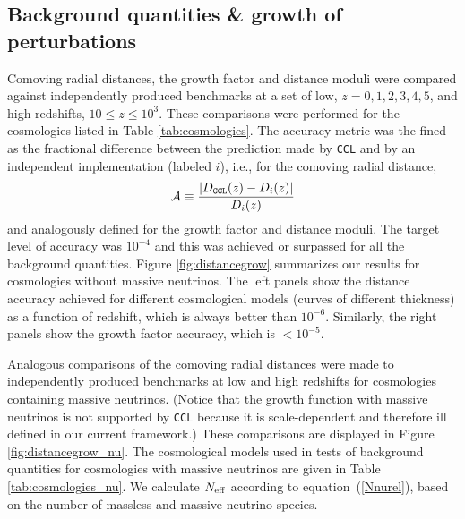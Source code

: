 \documentclass[\docopts]{\docclass}
\newcommand{\ccl}{{\tt CCL}\xspace}
\begin{document}
\subsection{Background quantities \& growth of perturbations}

Comoving radial distances, the growth factor and distance moduli were compared against independently produced benchmarks at a set of low, $z = 0,1,2,3,4,5$, and high redshifts, $10\leq z \leq 10^3$. These comparisons were performed for the cosmologies listed in Table \ref{tab:cosmologies}. The accuracy metric was the fined as the fractional difference between the prediction made by \ccl and by an independent implementation (labeled $i$), i.e., for the comoving radial distance,
\begin{equation}
  \mathcal{A} \equiv \frac{|D_{\tt CCL}(z)-D_{i}(z)|}{D_i(z)}
\end{equation}
and analogously defined for the growth factor and distance moduli.
The target level of accuracy was $10^{-4}$ and this was achieved or surpassed for all the background quantities. Figure \ref{fig:distancegrow} summarizes our results for cosmologies without massive neutrinos. The left panels show the distance accuracy achieved for different cosmological models (curves of different thickness) as a function of redshift, which is always better than $10^{-6}$. Similarly, the right panels show the growth factor accuracy, which is $<10^{-5}$. 

Analogous comparisons of the comoving radial distances were made to independently produced benchmarks at low and high redshifts for cosmologies containing massive neutrinos. (Notice that the growth function with massive neutrinos is not supported by \ccl because it is scale-dependent and therefore ill defined in our current framework.) These comparisons are displayed in Figure \ref{fig:distancegrow_nu}. The cosmological models used in tests of background quantities for cosmologies with massive neutrinos are given in Table \ref{tab:cosmologies_nu}. We calculate $N_{\rm eff}$ according to equation~(\ref{Nnurel}), based on the number of massless and massive neutrino species.


\end{document}
